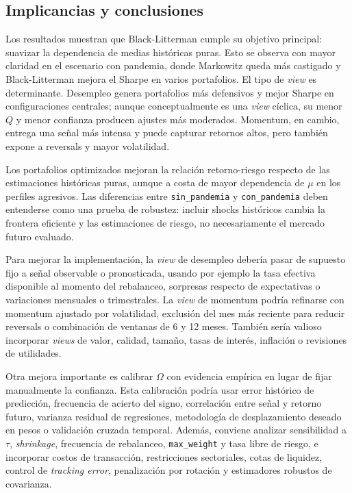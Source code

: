 \subsection*{Implicancias y conclusiones}

Los resultados muestran que Black-Litterman cumple su objetivo principal:
suavizar la dependencia de medias hist\'oricas puras. Esto se observa con mayor
claridad en el escenario con pandemia, donde Markowitz queda m\'as castigado y
Black-Litterman mejora el Sharpe en varios portafolios. El tipo de \textit{view}
es determinante. Desempleo genera portafolios m\'as defensivos y mejor Sharpe en
configuraciones centrales; aunque conceptualmente es una \textit{view}
c\'iclica, su menor $Q$ y menor confianza producen ajustes m\'as moderados.
Momentum, en cambio, entrega una se\~nal m\'as intensa y puede capturar retornos
altos, pero tambi\'en expone a reversals y mayor volatilidad.

Los portafolios optimizados mejoran la relaci\'on retorno-riesgo respecto de las
estimaciones hist\'oricas puras, aunque a costa de mayor dependencia de $\mu$ en
los perfiles agresivos. Las diferencias entre \texttt{sin\_pandemia} y
\texttt{con\_pandemia} deben entenderse como una prueba de robustez: incluir
shocks hist\'oricos cambia la frontera eficiente y las estimaciones de riesgo, no
necesariamente el mercado futuro evaluado.

Para mejorar la implementaci\'on, la \textit{view} de desempleo deber\'ia pasar de
supuesto fijo a se\~nal observable o pronosticada, usando por ejemplo la tasa
efectiva disponible al momento del rebalanceo, sorpresas respecto de
expectativas o variaciones mensuales o trimestrales. La \textit{view} de
momentum podr\'ia refinarse con momentum ajustado por volatilidad, exclusi\'on del
mes m\'as reciente para reducir reversals o combinaci\'on de ventanas de 6 y
12 meses. Tambi\'en ser\'ia valioso incorporar \textit{views} de valor, calidad,
tama\~no, tasas de inter\'es, inflaci\'on o revisiones de utilidades.

Otra mejora importante es calibrar $\Omega$ con evidencia emp\'irica en lugar de
fijar manualmente la confianza. Esta calibraci\'on podr\'ia usar error hist\'orico
de predicci\'on, frecuencia de acierto del signo, correlaci\'on entre se\~nal y
retorno futuro, varianza residual de regresiones, metodolog\'ia de
desplazamiento deseado en pesos o validaci\'on cruzada temporal. Adem\'as,
conviene analizar sensibilidad a $\tau$, \textit{shrinkage}, frecuencia de
rebalanceo, \texttt{max\_weight} y tasa libre de riesgo, e incorporar costos de
transacci\'on, restricciones sectoriales, cotas de liquidez, control de
\textit{tracking error}, penalizaci\'on por rotaci\'on y estimadores robustos de
covarianza.


